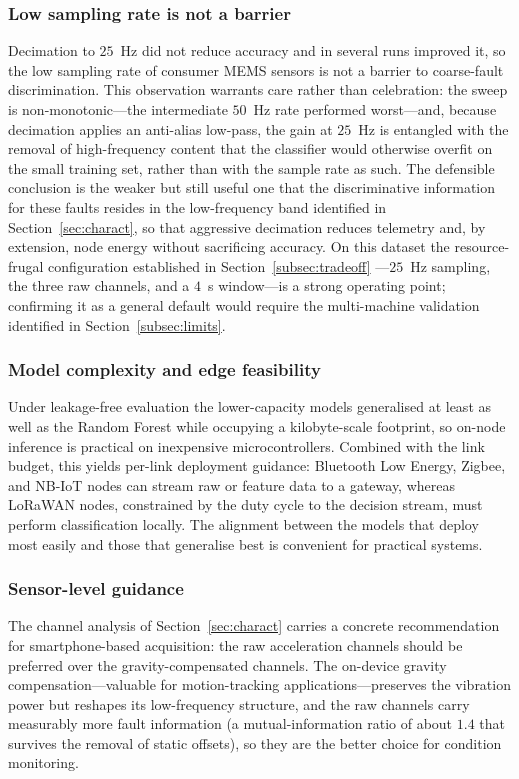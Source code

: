 \subsubsection{Low sampling rate is not a barrier}
Decimation to $25$~Hz did not reduce accuracy and in several runs improved it, so
the low sampling rate of consumer MEMS sensors is not a barrier to coarse-fault
discrimination. This observation warrants care rather than celebration: the sweep
is non-monotonic---the intermediate $50$~Hz rate performed worst---and, because
decimation applies an anti-alias low-pass, the gain at $25$~Hz is entangled with
the removal of high-frequency content that the classifier would otherwise overfit
on the small training set, rather than with the sample rate as such. The
defensible conclusion is the weaker but still useful one that the discriminative
information for these faults resides in the low-frequency band identified in
Section~\ref{sec:charact}, so that aggressive decimation reduces telemetry and, by
extension, node energy without sacrificing accuracy. On this dataset the
resource-frugal configuration established in Section~\ref{subsec:tradeoff}
---$25$~Hz sampling, the three raw channels, and a $4$~s window---is a strong
operating point; confirming it as a general default would require the
multi-machine validation identified in Section~\ref{subsec:limits}.

\subsubsection{Model complexity and edge feasibility}
Under leakage-free evaluation the lower-capacity models generalised at least as
well as the Random Forest while occupying a kilobyte-scale footprint, so on-node
inference is practical on inexpensive microcontrollers. Combined with the link
budget, this yields per-link deployment guidance: Bluetooth Low Energy, Zigbee,
and NB-IoT nodes can stream raw or feature data to a gateway, whereas LoRaWAN
nodes, constrained by the duty cycle to the decision stream, must perform
classification locally. The alignment between the models that deploy most easily
and those that generalise best is convenient for practical systems.

\subsubsection{Sensor-level guidance}
The channel analysis of Section~\ref{sec:charact} carries a concrete
recommendation for smartphone-based acquisition: the raw acceleration channels
should be preferred over the gravity-compensated channels. The on-device gravity
compensation---valuable for motion-tracking applications---preserves the vibration
power but reshapes its low-frequency structure, and the raw channels carry
measurably more fault information (a mutual-information ratio of about $1.4$ that
survives the removal of static offsets), so they are the better choice for
condition monitoring.

